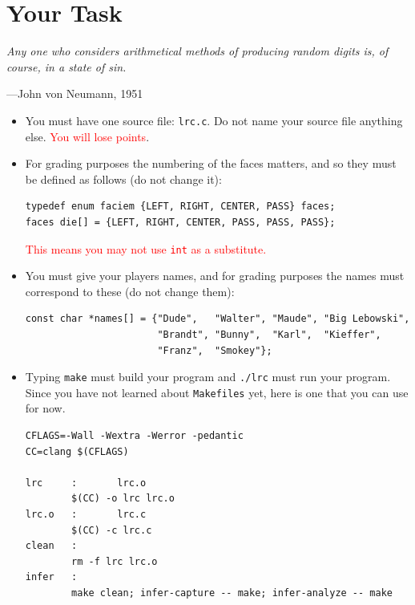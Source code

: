 \documentclass{article}
\begin{document}

\section{Your Task}
\textwidth
\epigraph{
\emph{Any one who considers arithmetical methods of producing random digits
is, of course, in a state of sin.}}{---John von Neumann, 1951}

\begin{itemize}

\item You must have one source file: \texttt{lrc.c}. Do not name
your source file anything else. \textcolor{red}{You will lose points}.


\item For grading purposes the numbering of the faces matters, and
so they must be defined as follows (do not change it):

\begin{lstlisting}
typedef enum faciem {LEFT, RIGHT, CENTER, PASS} faces;
faces die[] = {LEFT, RIGHT, CENTER, PASS, PASS, PASS};
\end{lstlisting}

\textcolor{red}{This means you may not use \texttt{int} as a substitute.}

\item You must give your players names, and for grading purposes the names
must correspond to these (do not change them):

{\small
\begin{lstlisting}
const char *names[] = {"Dude",   "Walter", "Maude", "Big Lebowski", 
                       "Brandt", "Bunny",  "Karl",  "Kieffer", 
                       "Franz",  "Smokey"};
\end{lstlisting}
}

\item Typing \texttt{make} must build your program and
\texttt{./lrc} must run your program. Since you have not learned
about \texttt{Makefiles} yet, here is one that you can use for now.

\begin{lstlisting}[title=\texttt{Makefile}]
CFLAGS=-Wall -Wextra -Werror -pedantic
CC=clang $(CFLAGS)

lrc     :       lrc.o
        $(CC) -o lrc lrc.o
lrc.o   :       lrc.c
        $(CC) -c lrc.c
clean   :
        rm -f lrc lrc.o
infer   :
        make clean; infer-capture -- make; infer-analyze -- make
\end{lstlisting}


\end{itemize}
\end{document}
